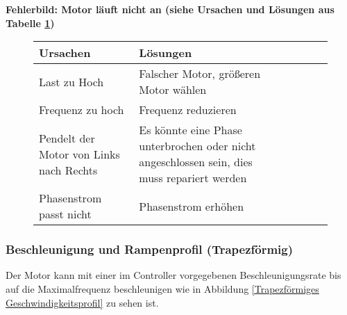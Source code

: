 {\textbf{Fehlerbild: Motor läuft nicht an (siehe Ursachen und Lösungen aus Tabelle \ref{MOTLNA})} 
\begin{figure}
	\begin{center}
		\fontsize{8}{10}\selectfont
		\begin{tabularx}{\textwidth}{|X|X|X|X|X|X|}
			\hline 
			\textbf{Ursachen} & \textbf{Lösungen} \\ \hline
			Last zu Hoch & Falscher Motor, größeren Motor wählen \\ \hline
			Frequenz zu hoch & Frequenz reduzieren\\ \hline
			Pendelt der Motor von Links nach Rechts & Es könnte eine Phase unterbrochen oder nicht angeschlossen sein, dies muss repariert werden \\ \hline
			Phasenstrom passt nicht & Phasenstrom erhöhen\\ \hline
			
		\end{tabularx}
		 \label{MOTLNA} 
	\end{center}
\end{figure}
	
	
	\subsubsection{Beschleunigung und Rampenprofil (Trapezförmig)}
	
Der Motor kann mit einer im Controller vorgegebenen Beschleunigungsrate bis auf die Maximalfrequenz beschleunigen wie in Abbildung \ref{Trapezförmiges Geschwindigkeitsprofil} zu sehen ist.\cite{FaulhaberDriveSystems.2020} 
	
}
